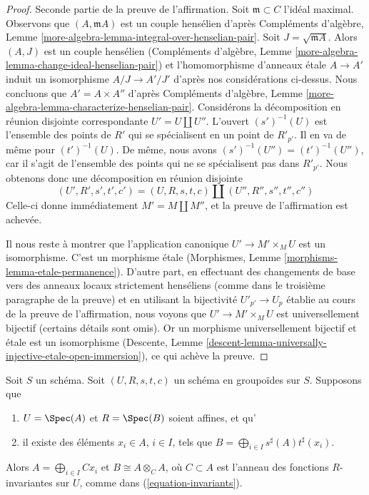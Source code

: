 \begin{proof}
\medskip\noindent
Seconde partie de la preuve de l'affirmation.
Soit $\mathfrak m \subset C$ l'idéal maximal.
Observons que $(A, \mathfrak m A)$ est un couple hensélien d'après
Compléments d'algèbre, Lemme \ref{more-algebra-lemma-integral-over-henselian-pair}.
Soit $J = \sqrt{\mathfrak m A}$.
Alors $(A, J)$ est un couple hensélien
(Compléments d'algèbre, Lemme \ref{more-algebra-lemma-change-ideal-henselian-pair})
et l'homomorphisme d'anneaux \'etale
$A \to A'$ induit un isomorphisme $A/J \to A'/J'$
d'après nos considérations ci-dessus.
Nous concluons que $A' = A \times A''$ d'après
Compléments d'algèbre, Lemme \ref{more-algebra-lemma-characterize-henselian-pair}.
Considérons la décomposition en réunion disjointe
correspondante $U' = U \amalg U''$. L'ouvert $(s')^{-1}(U)$ est l'ensemble
des points de $R'$ qui se spécialisent en un point de $R'_{p'}$.
Il en va de même pour $(t')^{-1}(U)$. De même, nous avons
$(s')^{-1}(U'') = (t')^{-1}(U'')$, car il s'agit de l'ensemble des
points qui ne se spécialisent pas dans $R'_{p'}$.
Nous obtenons donc une décomposition en réunion disjointe
$$
(U', R', s', t', c') =
(U, R, s, t, c) \amalg
(U'', R'', s'', t'', c'')
$$
Celle-ci donne immédiatement $M' = M \amalg M''$, et la preuve de l'affirmation
est achevée.

\medskip\noindent
Il nous reste à montrer que l'application canonique $U' \to M' \times_M U$
est un isomorphisme. C'est un morphisme \'etale
(Morphismes, Lemme \ref{morphisms-lemma-etale-permanence}).
D'autre part, en effectuant des changements de base vers des anneaux locaux strictement henséliens
(comme dans le troisième paragraphe de la preuve) et en utilisant la bijectivité
$U'_{p'} \to U_p$ établie au cours de la preuve de l'affirmation,
nous voyons que $U' \to M' \times_M U$ est universellement bijectif
(certains détails sont omis). Or un morphisme universellement bijectif
et \'etale est un isomorphisme
(Descente, Lemme \ref{descent-lemma-universally-injective-etale-open-immersion}),
ce qui achève la preuve.
\end{proof}

\begin{lemma}
\label{lemma-basis}
Soit $S$ un schéma.
Soit $(U, R, s, t, c)$ un schéma en groupoïdes sur $S$.
Supposons que
\begin{enumerate}
\item $U = \Spec(A)$ et $R = \Spec(B)$ soient affines, et qu'
\item il existe des éléments $x_i \in A$, $i \in I$, tels que
$B = \bigoplus_{i \in I} s^\sharp(A)t^\sharp(x_i)$.
\end{enumerate}
Alors $A = \bigoplus_{i\in I} Cx_i$ et $B \cong A \otimes_C A$,
où $C \subset A$ est l'anneau des fonctions $R$-invariantes
sur $U$, comme dans (\ref{equation-invariants}).
\end{lemma}

